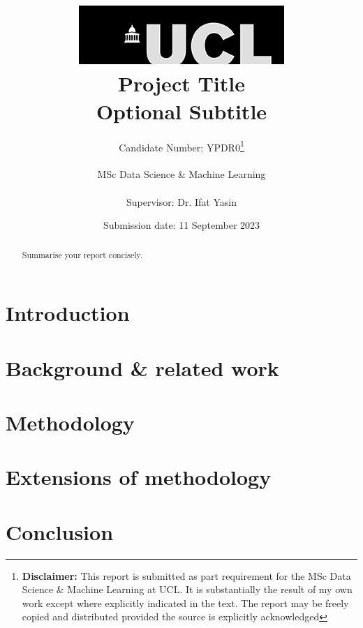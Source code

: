 \documentclass{report}
\title{  	{ \includegraphics[scale=.5]{ucl_logo.png}}\\
{{\Huge Project Title}}\\
{\large Optional Subtitle}\\}
\date{Submission date: 11 September 2023}
\author{Candidate Number: YPDR0\thanks{
{\bf Disclaimer:}
This report is submitted as part requirement for the MSc Data Science \& Machine
Learning at UCL. It is substantially the result of my own work except where
explicitly indicated in the text. The report may be freely copied and
distributed provided the source is explicitly acknowledged
}
\\ \\
MSc Data Science \& Machine Learning\\ \\
Supervisor: Dr. Ifat Yasin}
\begin{document}
 
 \onehalfspacing
\maketitle
\begin{abstract}
Summarise your report concisely.
\end{abstract}
\tableofcontents
\setcounter{page}{1}


\chapter{Introduction}


\chapter{Background \& related work}


\chapter{Methodology}


\chapter{Extensions of methodology}


\chapter{Conclusion}


\appendix



\end{document}
